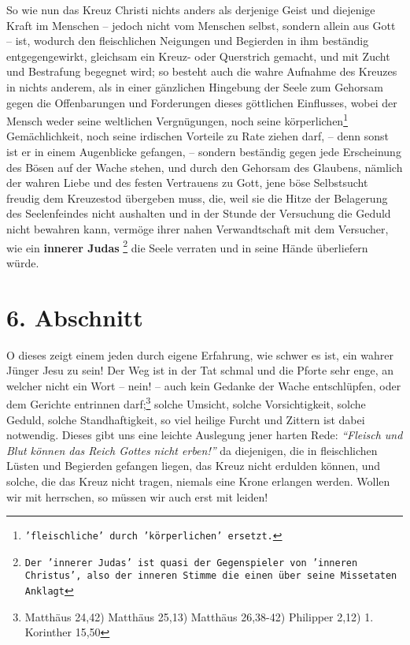 \medskip

So wie nun das Kreuz Christi nichts anders als derjenige Geist und diejenige
Kraft im Menschen -- jedoch nicht vom Menschen selbst, sondern allein aus Gott
--
ist, wodurch den fleischlichen Neigungen und Begierden in ihm beständig
entgegengewirkt, gleichsam ein Kreuz- oder Querstrich gemacht, und mit Zucht und
Bestrafung begegnet wird; so besteht auch die wahre Aufnahme des Kreuzes in
nichts anderem, als in einer gänzlichen Hingebung der Seele zum Gehorsam gegen
die Offenbarungen und Forderungen dieses göttlichen Einflusses, wobei der Mensch
weder seine weltlichen Vergnügungen, noch seine
körperlichen\footnote{\texttt{'fleischliche' durch 'körperlichen' ersetzt.}}
Gemächlichkeit,
noch seine irdischen Vorteile zu Rate ziehen darf, -- denn sonst ist er in
einem Augenblicke gefangen, -- sondern beständig gegen jede Erscheinung des
Bösen auf der Wache stehen, und durch den Gehorsam des Glaubens, nämlich der
wahren Liebe und des festen Vertrauens zu Gott, jene böse Selbstsucht freudig
dem Kreuzestod übergeben muss, die, weil sie die Hitze der Belagerung des
Seelenfeindes nicht aushalten und in der Stunde der Versuchung die Geduld nicht
bewahren kann, vermöge ihrer nahen Verwandtschaft mit dem Versucher, wie ein
\textbf{innerer Judas}
\footnote{\texttt{Der 'innerer Judas' ist quasi der Gegenspieler von 'inneren
Christus', also der inneren Stimme die einen über seine Missetaten Anklagt}}
die Seele verraten und in seine Hände überliefern würde.



\section{6. Abschnitt} \label{kap3_ab6}

O dieses zeigt einem jeden durch eigene Erfahrung, wie schwer es ist, ein wahrer
Jünger Jesu zu sein! Der Weg ist in der Tat schmal und die Pforte sehr enge, an
welcher nicht ein Wort -- nein! -- auch kein Gedanke der Wache entschlüpfen,
oder
dem Gerichte entrinnen darf;\footnote{Matthäus 24,42) Matthäus 25,13) Matthäus
26,38-42)
Philipper 2,12) 1. Korinther 15,50}
solche Umsicht, solche Vorsichtigkeit, solche Geduld,
solche Standhaftigkeit, so viel heilige Furcht und Zittern ist dabei notwendig.
Dieses gibt uns eine leichte Auslegung jener harten Rede:
\textit{"`Fleisch und Blut können das Reich Gottes nicht erben!"'}
da diejenigen, die in fleischlichen
Lüsten und Begierden gefangen liegen, das Kreuz nicht erdulden können, und
solche, die das Kreuz nicht tragen, niemals eine Krone erlangen werden. Wollen
wir mit herrschen, so müssen wir auch erst mit leiden!




